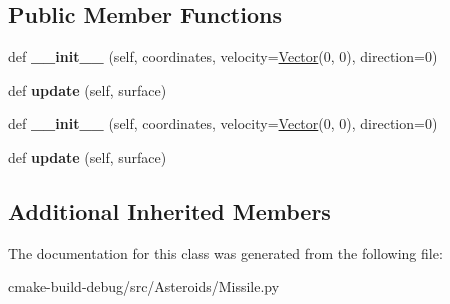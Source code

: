 \subsection*{Public Member Functions}
\begin{DoxyCompactItemize}
\item 
def {\bfseries \+\_\+\+\_\+init\+\_\+\+\_\+} (self, coordinates, velocity=\hyperlink{classVector_1_1Vector}{Vector}(0, 0), direction=0)\hypertarget{classMissile_1_1Missile_acd19b70b0fff20d2d1fb2e18c8455e93}{}\label{classMissile_1_1Missile_acd19b70b0fff20d2d1fb2e18c8455e93}

\item 
def {\bfseries update} (self, surface)\hypertarget{classMissile_1_1Missile_ab1ae0964e6012a269eedb97e906f9d58}{}\label{classMissile_1_1Missile_ab1ae0964e6012a269eedb97e906f9d58}

\item 
def {\bfseries \+\_\+\+\_\+init\+\_\+\+\_\+} (self, coordinates, velocity=\hyperlink{classVector_1_1Vector}{Vector}(0, 0), direction=0)\hypertarget{classMissile_1_1Missile_acd19b70b0fff20d2d1fb2e18c8455e93}{}\label{classMissile_1_1Missile_acd19b70b0fff20d2d1fb2e18c8455e93}

\item 
def {\bfseries update} (self, surface)\hypertarget{classMissile_1_1Missile_ab1ae0964e6012a269eedb97e906f9d58}{}\label{classMissile_1_1Missile_ab1ae0964e6012a269eedb97e906f9d58}

\end{DoxyCompactItemize}
\subsection*{Additional Inherited Members}


The documentation for this class was generated from the following file\+:\begin{DoxyCompactItemize}
\item 
cmake-\/build-\/debug/src/\+Asteroids/Missile.\+py\end{DoxyCompactItemize}
